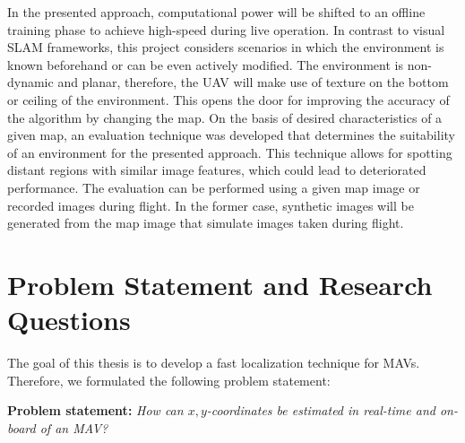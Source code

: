 \documentclass[11pt]{report}
\begin{document}
In the presented approach, computational power will be shifted to an
offline training phase to achieve high-speed during live operation. In
contrast to visual SLAM frameworks, this project considers scenarios
in which the environment is known beforehand or can be even actively
modified. The environment is non-dynamic and planar, therefore, the
UAV will make use of texture on the bottom or ceiling of the
environment. This opens the door for improving the accuracy of the
algorithm by changing the map. On the basis of desired characteristics
of a given map, an evaluation technique was developed that determines
the suitability of an environment for the presented approach. This technique
allows for spotting distant regions with similar image features, which
could lead to deteriorated performance. The evaluation can be
performed using a given map image or recorded images during flight. In
the former case, synthetic images will be generated from the map image
that simulate images taken during flight.


\section{Problem Statement and Research Questions}
\label{sec:researchquestions}

The goal of this thesis is to develop a fast localization technique
for MAVs. Therefore, we formulated the following problem statement:

\par
\begingroup
\leftskip=0.7cm %
\noindent \textbf{Problem statement:} \emph{How can
    $x,y$-coordinates be estimated in real-time and on-board of an
    MAV?} %
\par
\endgroup
\end{document}
